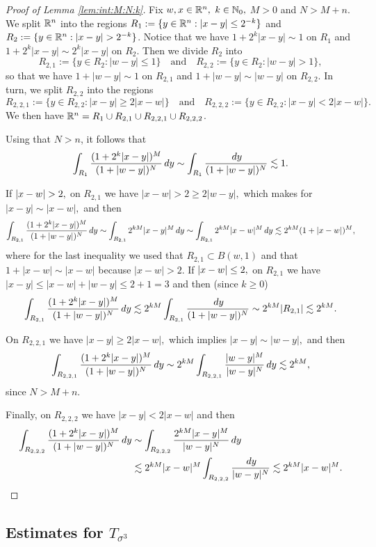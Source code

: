 \begin{proof}[Proof of Lemma \ref{lem:int:M:N:k}] Fix $w,x\in{{\mathbb R}^n},$  $k\in\mathbb{N}_0,$ $M>0$ and $N>M+n.$ We split ${{\mathbb R}^n}$ into the regions $R_1:=\{y \in {{\mathbb R}^n}: |x-y| \leq 2^{-k} \}$ and $R_2:=\{y \in {{\mathbb R}^n}: |x-y| > 2^{-k} \}$. Notice that we have $1 + 2^k |x-y| \sim 1$ on $R_1$   and $1 + 2^k |x-y| \sim 2^k |x-y|$ on $R_2$. Then we divide  $R_2$ into 
$$
R_{2,1}:= \{y \in R_2: |w-y| \leq 1 \}\quad \text{and} \quad R_{2,2}:= \{y \in R_2: |w-y| > 1 \},
$$
so that we have $1+ |w-y| \sim 1$ on $R_{2,1}$ and $1+ |w-y| \sim |w-y|$ on $R_{2,2}$. In turn,  we split $R_{2,2}$ into the regions
$$
R_{2,2,1}:= \{y \in R_{2,2}: |x-y| \geq 2 |x-w| \}\quad \text{and} \quad R_{2,2,2}:= \{y \in R_{2,2}: |x-y| < 2 |x-w| \}.
$$
We then have ${{\mathbb R}^n} = R_1\cup  R_{2,1} \cup R_{2,2,1} \cup R_{2,2,2}$. 

Using that $N > n$, it follows that
$$
\int_{R_1} \frac{(1+ 2^k |x-y|)^M}{(1+ |w - y|)^N} \, dy \sim \int_{R_1} \frac{\, dy}{(1+ |w - y|)^N} \lesssim 1. 
$$

If $\left\vert x-w \right\vert>2,$ on $R_{2,1}$ we have $|x-w| > 2 \geq 2 |w-y|,$ which makes for $|x-y| \sim |x - w|,$ and then
$$
\int_{R_{2,1}} \frac{(1+ 2^k |x-y|)^M}{(1+ |w - y|)^N} \, dy \sim \int_{R_{2,1}} 2^{kM} |x-y|^M \, dy \sim \int_{R_{2,1}} 2^{kM} |x-w|^M \, dy   \lesssim  2^{kM} (1 + |x-w|)^M,
$$
where for the last inequality we used that $R_{2,1} \subset B(w, 1)$ and that $1 + |x-w| \sim |x-w|$ because $|x-w| > 2$. 
If $\left\vert x-w \right\vert\le 2,$ on $R_{2,1}$ we have $|x -y| \leq |x-w| + |w - y| \leq 2 + 1 = 3$ and then (since $k \geq 0$)
$$
\int_{R_{2,1}} \frac{(1+ 2^k |x-y|)^M}{(1+ |w - y|)^N} \, dy \lesssim 2^{kM} \int_{R_{2,1}} \frac{\, dy}{(1+ |w - y|)^N} \sim 2^{kM} |R_{2,1}| \lesssim  2^{kM}.
$$

On $R_{2,2,1}$ we have $|x-y| \geq 2 |x-w|,$ which implies $|x-y| \sim |w-y|,$ and then
$$
\int_{R_{2,2,1}} \frac{(1+ 2^k |x-y|)^M}{(1+ |w - y|)^N} \, dy \sim 2^{kM} \int_{R_{2,2,1}} \frac{|w-y|^M}{|w - y|^N} \, dy  \lesssim 2^{kM},
$$
since $N  >M+  n$. 

Finally, on  $R_{2,2,2}$ we have $|x-y| < 2 |x-w|$ and then
\begin{align*}
\int_{R_{2,2,2}} \frac{(1+ 2^k |x-y|)^M}{(1+ |w - y|)^N} \, dy &\sim \int_{R_{2,2,2}} \frac{2^{kM} |x-y|^M}{|w - y|^N} \, dy \\&\lesssim  2^{kM} |x-w|^M  \int_{R_{2,2,2}}  \frac{\, dy}{|w - y|^N}  \lesssim  2^{kM} |x-w|^M.
\end{align*}
\end{proof}
\subsection{Estimates for $T_{\sigma^3}$}\label{sec:T3}

